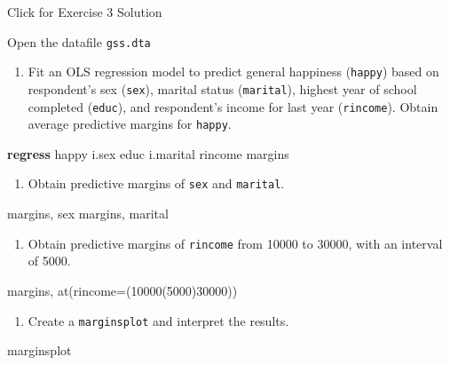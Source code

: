 \documentclass[
]{book}
\newenvironment{Shaded}{\begin{snugshade}}{\end{snugshade}}
\newcommand{\FunctionTok}[1]{\textcolor[rgb]{0.00,0.00,0.00}{#1}}
\newcommand{\KeywordTok}[1]{\textcolor[rgb]{0.13,0.29,0.53}{\textbf{#1}}}
\newcommand{\NormalTok}[1]{#1}
\providecommand{\tightlist}{%
  \setlength{\itemsep}{0pt}\setlength{\parskip}{0pt}}
\begin{document}
{Click for Exercise 3 Solution}

\begin{alert}

Open the datafile \texttt{gss.dta}

\begin{enumerate}
\def\labelenumi{\arabic{enumi}.}
\tightlist
\item
  Fit an OLS regression model to predict general happiness (\texttt{happy}) based on respondent's sex (\texttt{sex}), marital status (\texttt{marital}), highest year of school completed (\texttt{educ}), and respondent's income for last year (\texttt{rincome}). Obtain average predictive margins for \texttt{happy}.
\end{enumerate}

\begin{Shaded}
\begin{Highlighting}[]
\KeywordTok{regress}\NormalTok{ happy i.sex educ i.marital rincome}
\NormalTok{margins }
\end{Highlighting}
\end{Shaded}

\begin{enumerate}
\def\labelenumi{\arabic{enumi}.}
\setcounter{enumi}{1}
\tightlist
\item
  Obtain predictive margins of \texttt{sex} and \texttt{marital}.
\end{enumerate}

\begin{Shaded}
\begin{Highlighting}[]
\NormalTok{margins, sex }
\NormalTok{margins, marital}
\end{Highlighting}
\end{Shaded}

\begin{enumerate}
\def\labelenumi{\arabic{enumi}.}
\setcounter{enumi}{2}
\tightlist
\item
  Obtain predictive margins of \texttt{rincome} from 10000 to 30000, with an interval of 5000.
\end{enumerate}

\begin{Shaded}
\begin{Highlighting}[]
\NormalTok{margins, }\FunctionTok{at}\NormalTok{(rincome=(10000(5000)30000))}
\end{Highlighting}
\end{Shaded}

\begin{enumerate}
\def\labelenumi{\arabic{enumi}.}
\setcounter{enumi}{3}
\tightlist
\item
  Create a \texttt{marginsplot} and interpret the results.
\end{enumerate}

\begin{Shaded}
\begin{Highlighting}[]
\NormalTok{marginsplot }
\end{Highlighting}
\end{Shaded}

\end{alert}
\end{document}
